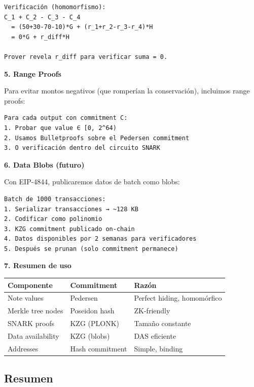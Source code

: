 \documentclass[11pt,a4paper,twoside,openright]{book}
\theoremstyle{definition}
\theoremstyle{plain}
\theoremstyle{remark}
\begin{document}
\begin{bancozk}
\begin{verbatim}
Verificación (homomorfismo):
C_1 + C_2 - C_3 - C_4 
  = (50+30-70-10)*G + (r_1+r_2-r_3-r_4)*H
  = 0*G + r_diff*H

Prover revela r_diff para verificar suma = 0.
\end{verbatim}

\textbf{5. Range Proofs}

Para evitar montos negativos (que romperían la conservación), incluimos range proofs:
\begin{verbatim}
Para cada output con commitment C:
1. Probar que value ∈ [0, 2^64)
2. Usamos Bulletproofs sobre el Pedersen commitment
3. O verificación dentro del circuito SNARK
\end{verbatim}

\textbf{6. Data Blobs (futuro)}

Con EIP-4844, publicaremos datos de batch como blobs:
\begin{verbatim}
Batch de 1000 transacciones:
1. Serializar transacciones → ~128 KB
2. Codificar como polinomio
3. KZG commitment publicado on-chain
4. Datos disponibles por 2 semanas para verificadores
5. Después se prunan (solo commitment permanece)
\end{verbatim}

\textbf{7. Resumen de uso}

\begin{center}
\begin{tabular}{lll}
\toprule
\textbf{Componente} & \textbf{Commitment} & \textbf{Razón} \\
\midrule
Note values & Pedersen & Perfect hiding, homomórfico \\
Merkle tree nodes & Poseidon hash & ZK-friendly \\
SNARK proofs & KZG (PLONK) & Tamaño constante \\
Data availability & KZG (blobs) & DAS eficiente \\
Addresses & Hash commitment & Simple, binding \\
\bottomrule
\end{tabular}
\end{center}
\end{bancozk}

\subsection{Resumen}
\end{document}
